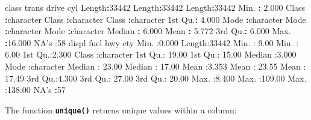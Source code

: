 \documentclass[
]{book}
\newenvironment{Shaded}{\begin{snugshade}}{\end{snugshade}}
\newcommand{\DecValTok}[1]{\textcolor[rgb]{0.00,0.00,0.81}{#1}}
\newcommand{\FloatTok}[1]{\textcolor[rgb]{0.00,0.00,0.81}{#1}}
\newcommand{\KeywordTok}[1]{\textcolor[rgb]{0.13,0.29,0.53}{\textbf{#1}}}
\newcommand{\NormalTok}[1]{#1}
\newcommand{\OperatorTok}[1]{\textcolor[rgb]{0.81,0.36,0.00}{\textbf{#1}}}
\newcommand{\StringTok}[1]{\textcolor[rgb]{0.31,0.60,0.02}{#1}}
\begin{document}
\begin{Shaded}
\begin{Highlighting}[]
\NormalTok{    class              trans              drive                cyl        }
\NormalTok{ Length}\OperatorTok{:}\DecValTok{33442}\NormalTok{       Length}\OperatorTok{:}\DecValTok{33442}\NormalTok{       Length}\OperatorTok{:}\DecValTok{33442}\NormalTok{       Min.   }\OperatorTok{:}\StringTok{ }\FloatTok{2.000}  
\NormalTok{ Class }\OperatorTok{:}\NormalTok{character   Class }\OperatorTok{:}\NormalTok{character   Class }\OperatorTok{:}\NormalTok{character   1st Qu.}\OperatorTok{:}\StringTok{ }\FloatTok{4.000}  
\NormalTok{ Mode  }\OperatorTok{:}\NormalTok{character   Mode  }\OperatorTok{:}\NormalTok{character   Mode  }\OperatorTok{:}\NormalTok{character   Median }\OperatorTok{:}\StringTok{ }\FloatTok{6.000}  
\NormalTok{                                                          Mean   }\OperatorTok{:}\StringTok{ }\FloatTok{5.772}  
\NormalTok{                                                          3rd Qu.}\OperatorTok{:}\StringTok{ }\FloatTok{6.000}  
\NormalTok{                                                          Max.   }\OperatorTok{:}\FloatTok{16.000}  
\NormalTok{                                                          NA}\StringTok{'s   :58      }
\StringTok{     displ           fuel                hwy              cty        }
\StringTok{ Min.   :0.000   Length:33442       Min.   :  9.00   Min.   :  6.00  }
\StringTok{ 1st Qu.:2.300   Class :character   1st Qu.: 19.00   1st Qu.: 15.00  }
\StringTok{ Median :3.000   Mode  :character   Median : 23.00   Median : 17.00  }
\StringTok{ Mean   :3.353                      Mean   : 23.55   Mean   : 17.49  }
\StringTok{ 3rd Qu.:4.300                      3rd Qu.: 27.00   3rd Qu.: 20.00  }
\StringTok{ Max.   :8.400                      Max.   :109.00   Max.   :138.00  }
\StringTok{ NA'}\NormalTok{s   }\OperatorTok{:}\DecValTok{57}                                                          
\end{Highlighting}
\end{Shaded}

The function \textbf{\texttt{unique()}} returns unique values within a column:

\begin{Shaded}
\end{Shaded}
\end{document}
